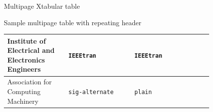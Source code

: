 \documentclass{beamer}
\begin{document}
\begin{frame}{Multipage Xtabular table}
\begin{table}
	\tablecaption
	{
		Sample multipage table with repeating header 
	}
	\label{tab:MyFirstTable}

	\begin{xtabular}{
			p{0.25\linewidth}
			p{0.27\linewidth}
			p{0.17\linewidth}
			m{0.15\linewidth}
		}
		Institute of Electrical and Electronics Engineers &\Verb|IEEEtran| & \Verb|IEEEtran|& \\ \midrule
		Association for Computing Machinery & \Verb|sig-alternate|  & \Verb|plain| &    \\ \midrule

\end{xtabular}
\end{table}
\end{frame}
\end{document}
